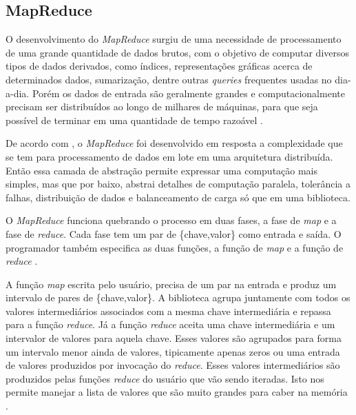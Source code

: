         \subsection{MapReduce}

            O desenvolvimento do \textit{MapReduce} surgiu de uma necessidade de processamento de uma grande
            quantidade de dados brutos, com o objetivo  de computar diversos tipos de dados derivados, como índices,
            representações gráficas acerca de determinados dados, sumarização, dentre outras \textit{queries} frequentes
            usadas no dia-a-dia. Porém os dados de entrada são geralmente grandes e computacionalmente precisam ser
            distribuídos ao longo de milhares de máquinas, para que seja possível de terminar em uma quantidade de
            tempo razoável \cite{dean2008}.

            De acordo com , o \textit{MapReduce} foi desenvolvido em resposta a complexidade
            que se tem para processamento de dados em lote em uma arquitetura distribuída. Então essa camada de
            abstração permite expressar uma computação mais simples, mas que por baixo, abstrai detalhes de computação
            paralela, tolerância a falhas, distribuição de dados e balanceamento de carga só que em uma biblioteca.

            O \textit{MapReduce} funciona quebrando o processo em duas fases, a fase de \textit{map} e a fase de
            \textit{reduce}. Cada fase tem um par de \{chave,valor\} como entrada e saída. O programador também
            especifica as duas funções, a função de \textit{map} e a função de \textit{reduce} \cite{white2015}.

            A função \textit{map} escrita pelo usuário, precisa de um par na entrada e produz um intervalo de pares de
            \{chave,valor\}. A biblioteca agrupa juntamente com todos os valores intermediários associados com a mesma
            chave intermediária e repassa para a função \textit{reduce}. Já a função \textit{reduce} aceita uma chave
            intermediária e um intervalor de valores para aquela chave. Esses valores são agrupados para forma um
            intervalo menor ainda de valores, tipicamente apenas zeros ou uma entrada de valores produzidos por
            invocação do \textit{reduce}. Esses valores intermediários são produzidos pelas funções \textit{reduce}
            do usuário que vão sendo iteradas. Isto nos permite manejar a lista de valores que são muito grandes
            para caber na memória \cite{dean2008}.

